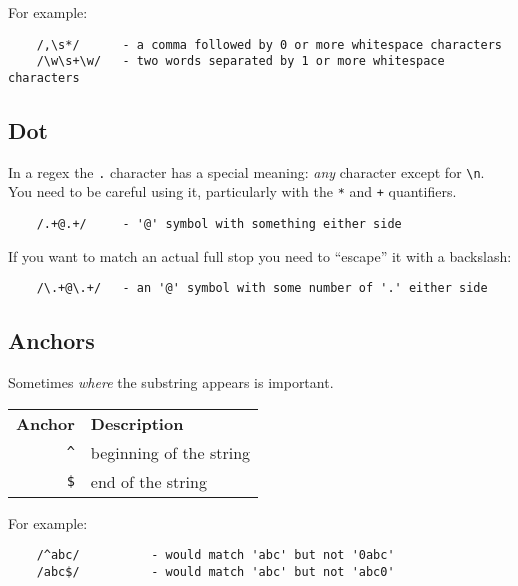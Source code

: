 For example:

\begin{verbatim}
    /,\s*/      - a comma followed by 0 or more whitespace characters
    /\w\s+\w/   - two words separated by 1 or more whitespace characters
\end{verbatim}


\subsection{Dot}

In a regex the \texttt{.} character has a special meaning: \textit{any} character except for \texttt{\textbackslash n}. You need to be careful using it, particularly with the \texttt{*} and \texttt{+} quantifiers.

\begin{verbatim}
    /.+@.+/     - '@' symbol with something either side
\end{verbatim}

If you want to match an actual full stop you need to ``escape'' it with a backslash:

\begin{verbatim}
    /\.+@\.+/   - an '@' symbol with some number of '.' either side
\end{verbatim}



\subsection{Anchors}

Sometimes \textit{where} the substring appears is important.

\begin{center}
    \begin{small}
        \begin{tabularx}{\textwidth}{r l}
            \textbf{Anchor}             & \textbf{Description} \\
            \texttt{\textasciicircum}   & beginning of the string \\
            \texttt{\$}                 & end of the string \\
        \end{tabularx}
    \end{small}
\end{center}

For example:

\begin{verbatim}
    /^abc/          - would match 'abc' but not '0abc'
    /abc$/          - would match 'abc' but not 'abc0'
\end{verbatim}


